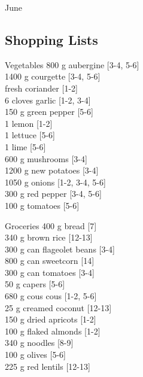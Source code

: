 \begin{menu}{June}
    \subsection*{Shopping Lists}
      \begin{shoppinglist}{Vegetables}
      800 g aubergine {\scriptsize[3-4, 5-6]}\\
      1400 g courgette {\scriptsize[3-4, 5-6]}\\
       fresh coriander {\scriptsize[1-2]}\\
      6 cloves garlic {\scriptsize[1-2, 3-4]}\\
      150 g green pepper {\scriptsize[5-6]}\\
      1  lemon {\scriptsize[1-2]}\\
      1  lettuce {\scriptsize[5-6]}\\
      1  lime {\scriptsize[5-6]}\\
      600 g mushrooms {\scriptsize[3-4]}\\
      1200 g new potatoes {\scriptsize[3-4]}\\
      1050 g onions {\scriptsize[1-2, 3-4, 5-6]}\\
      300 g red pepper {\scriptsize[3-4, 5-6]}\\
      100 g tomatoes {\scriptsize[5-6]}\\
      \end{shoppinglist}%
      \begin{shoppinglist}{Groceries}
      400 g bread {\scriptsize[7]}\\
      340 g brown rice {\scriptsize[12-13]}\\
      300 g can flageolet beans {\scriptsize[3-4]}\\
      800 g can sweetcorn {\scriptsize[14]}\\
      300 g can tomatoes {\scriptsize[3-4]}\\
      50 g capers {\scriptsize[5-6]}\\
      680 g cous cous {\scriptsize[1-2, 5-6]}\\
      25 g creamed coconut {\scriptsize[12-13]}\\
      150 g dried apricots {\scriptsize[1-2]}\\
      100 g flaked almonds {\scriptsize[1-2]}\\
      340 g noodles {\scriptsize[8-9]}\\
      100 g olives {\scriptsize[5-6]}\\
      225 g red lentils {\scriptsize[12-13]}\\

\end{shoppinglist}
\end{menu}
